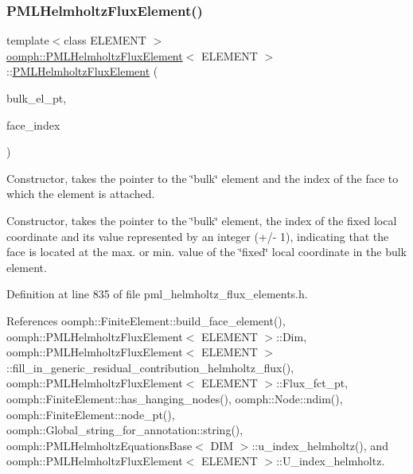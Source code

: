 \subsubsection{\texorpdfstring{P\+M\+L\+Helmholtz\+Flux\+Element()}{PMLHelmholtzFluxElement()}\hspace{0.1cm}{\footnotesize\ttfamily [1/3]}}
{\footnotesize\ttfamily template$<$class E\+L\+E\+M\+E\+NT $>$ \\
\hyperlink{classoomph_1_1PMLHelmholtzFluxElement}{oomph\+::\+P\+M\+L\+Helmholtz\+Flux\+Element}$<$ E\+L\+E\+M\+E\+NT $>$\+::\hyperlink{classoomph_1_1PMLHelmholtzFluxElement}{P\+M\+L\+Helmholtz\+Flux\+Element} (\begin{DoxyParamCaption}\item[{\hyperlink{classoomph_1_1FiniteElement}{Finite\+Element} $\ast$const \&}]{bulk\+\_\+el\+\_\+pt,  }\item[{const int \&}]{face\+\_\+index }\end{DoxyParamCaption})}



Constructor, takes the pointer to the \char`\"{}bulk\char`\"{} element and the index of the face to which the element is attached. 

Constructor, takes the pointer to the \char`\"{}bulk\char`\"{} element, the index of the fixed local coordinate and its value represented by an integer (+/-\/ 1), indicating that the face is located at the max. or min. value of the \char`\"{}fixed\char`\"{} local coordinate in the bulk element. 

Definition at line 835 of file pml\+\_\+helmholtz\+\_\+flux\+\_\+elements.\+h.



References oomph\+::\+Finite\+Element\+::build\+\_\+face\+\_\+element(), oomph\+::\+P\+M\+L\+Helmholtz\+Flux\+Element$<$ E\+L\+E\+M\+E\+N\+T $>$\+::\+Dim, oomph\+::\+P\+M\+L\+Helmholtz\+Flux\+Element$<$ E\+L\+E\+M\+E\+N\+T $>$\+::fill\+\_\+in\+\_\+generic\+\_\+residual\+\_\+contribution\+\_\+helmholtz\+\_\+flux(), oomph\+::\+P\+M\+L\+Helmholtz\+Flux\+Element$<$ E\+L\+E\+M\+E\+N\+T $>$\+::\+Flux\+\_\+fct\+\_\+pt, oomph\+::\+Finite\+Element\+::has\+\_\+hanging\+\_\+nodes(), oomph\+::\+Node\+::ndim(), oomph\+::\+Finite\+Element\+::node\+\_\+pt(), oomph\+::\+Global\+\_\+string\+\_\+for\+\_\+annotation\+::string(), oomph\+::\+P\+M\+L\+Helmholtz\+Equations\+Base$<$ D\+I\+M $>$\+::u\+\_\+index\+\_\+helmholtz(), and oomph\+::\+P\+M\+L\+Helmholtz\+Flux\+Element$<$ E\+L\+E\+M\+E\+N\+T $>$\+::\+U\+\_\+index\+\_\+helmholtz.

